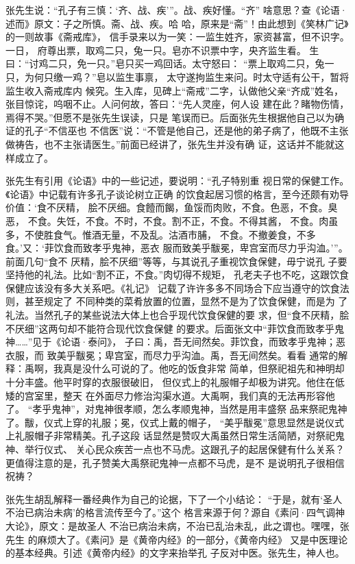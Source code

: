 张先生说：“孔子有三慎：‘齐、战、疾’”。战、疾好懂。“齐”
啥意思？查《论语·述而》原文：子之所慎。斋、战、疾。哈
哈，原来是“斋”！由此想到《笑林广记》的一则故事《斋戒库》，
信手录来以为一笑：一监生姓齐，家资甚富，但不识字。一日，
府尊出票，取鸡二只，兔一只。皂亦不识票中字，央齐监生看。
生曰：“讨鸡二只，免一只。”皂只买一鸡回话。太守怒曰：
“票上取鸡二只，兔一只，为何只缴一鸡？”皂以监生事禀，
太守遂拘监生来问。时太守适有公干，暂将监生收入斋戒库内
候究。生入库，见碑上“斋戒”二字，认做他父亲“齐成”姓名，
张目惊诧，呜咽不止。人问何故，答曰：“先人灵座，何人设
建在此？睹物伤情，焉得不哭。”但愿不是张先生误读，只是
笔误而已。后面张先生根据他自己以为确证的孔子“不信巫也
不信医”说：“不管是他自己，还是他的弟子病了，他既不主张
做祷告，也不主张请医生。”前面已经讲了，张先生并没有确
证，这话并不能就这样成立了。

张先生有引用《论语》中的一些记述，要说明：“孔子特别重
视日常的保健工作。《论语》中记载有许多孔子谈论树立正确
的饮食起居习惯的格言，至今还颇有劝导价值：‘食不厌精，
脍不厌细。食饐而餲，鱼馁而肉败，不食。色恶，不食。臭恶，
不食。失饪，不食。不时，不食。割不正，不食。不得其酱，
不食。肉虽多，不使胜食气。惟酒无量，不及乱。沽酒市脯，
不食。不撤姜食，不多食。’又：‘菲饮食而致孝乎鬼神，恶衣
服而致美乎黻冕，卑宫室而尽力乎沟洫。’”。前面几句“食不
厌精，脍不厌细”等等，与其说孔子重视饮食保健，毋宁说孔
子要坚持他的礼法。比如“割不正，不食。”肉切得不规矩，
孔老夫子也不吃，这跟饮食保健应该没有多大关系吧。《礼记》
记载了许许多多不同场合下应当遵守的饮食法则，甚至规定了
不同种类的菜肴放置的位置，显然不是为了饮食保健，而是为
了礼法。当然孔子的某些说法大体上也合乎现代饮食保健的要
求，但“食不厌精，脍不厌细”这两句却不能符合现代饮食保健
的要求。后面张文中“菲饮食而致孝乎鬼神……”见于《论语·泰问》，
子曰：禹，吾无间然矣。菲饮食，而致孝乎鬼神；恶衣服，而
致美乎黻冕；卑宫室，而尽力乎沟洫。禹，吾无间然矣。看看
通常的解释：禹啊，我真是没什么可说的了。他吃的饭食非常
简单，但祭祀祖先和神明却十分丰盛。他平时穿的衣服很破旧，
但仪式上的礼服帽子却极为讲究。他住在低矮的宫室里，整天
在外面尽力修治沟渠水道。大禹啊，我们真的无法再形容他了。
“孝乎鬼神”，对鬼神很孝顺，怎么孝顺鬼神，当然是用丰盛祭
品来祭祀鬼神了。黻，仪式上穿的礼服；冕，仪式上戴的帽子，
“美乎黻冕”意思显然是说仪式上礼服帽子非常精美。孔子这段
话显然是赞叹大禹虽然日常生活简陋，对祭祀鬼神、举行仪式、
关心民众疾苦一点也不马虎。这跟孔子的起居保健有什么关系？
更值得注意的是，孔子赞美大禹祭祀鬼神一点都不马虎，是不
是说明孔子很相信祝祷？

张先生胡乱解释一番经典作为自己的论据，下了一个小结论：
“于是，就有‘圣人不治已病治未病’的格言流传至今了。”这个
格言来源于何？源自《素问·四气调神大论》，原文：是故圣人
不治已病治未病，不治已乱治未乱，此之谓也。嘿嘿，张先生
的麻烦大了。《素问》是《黄帝内经》的一部分，《黄帝内经》
又是中医理论的基本经典。引述《黄帝内经》的文字来抬举孔
子反对中医。张先生，神人也。

